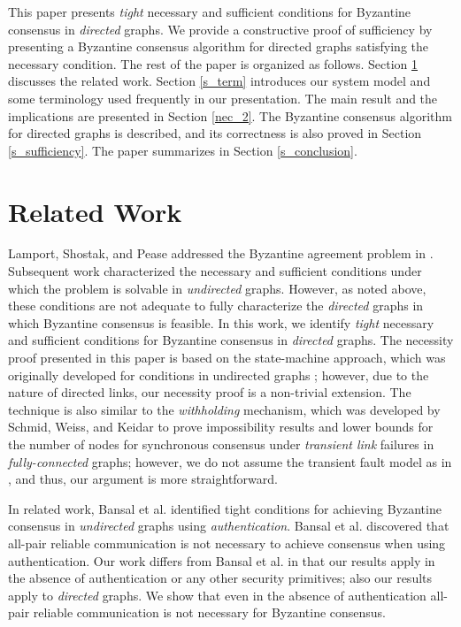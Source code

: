 \documentclass[letterpaper, 11pt]{article}
\begin{document}
This paper presents {\em tight} necessary and sufficient conditions for Byzantine consensus in {\em directed} graphs. We provide a constructive proof of sufficiency by presenting a Byzantine consensus algorithm for directed graphs satisfying the necessary condition. The rest of the paper is organized as follows. Section \ref{s_related} discusses the related work. Section \ref{s_term} introduces our system model and some terminology used frequently in our presentation. The main result and the implications are presented in Section \ref{nec_2}. The Byzantine consensus algorithm for directed graphs is described, and its correctness is also proved in Section \ref{s_sufficiency}. The paper summarizes in Section \ref{s_conclusion}.



\section{Related Work}
\label{s_related}

Lamport, Shostak, and Pease addressed the Byzantine agreement problem in \cite{psl_BG_1982}. Subsequent work \cite{impossible_proof_lynch, dolev_82_BG} characterized the necessary and sufficient conditions under which the problem is solvable in {\em undirected} graphs. However, as noted above, these conditions are not adequate to fully characterize the {\em directed} graphs in which Byzantine consensus is feasible. In this work, we identify {\em tight} necessary and sufficient conditions for Byzantine consensus in {\em directed} graphs. The necessity proof presented in this paper is based on the state-machine approach, which was originally developed for conditions in undirected graphs \cite{impossible_proof_lynch,dolev_82_BG,welch_book}; however, due to the nature of directed links, our necessity proof is a non-trivial extension. The technique is also similar to the {\em withholding} mechanism, which was developed by Schmid, Weiss, and Keidar \cite{impossible_link} to prove impossibility results and lower bounds for the number of nodes for synchronous consensus under {\em transient link} failures in {\em fully-connected} graphs; however, we do not assume the transient fault model as in \cite{impossible_link}, and thus, our argument is more straightforward.

In related work, Bansal et al. \cite{Bansal_disc11} identified tight conditions for achieving Byzantine consensus in {\em undirected} graphs using {\em authentication}. Bansal et al. discovered that all-pair reliable communication is not necessary to achieve consensus when using authentication. Our work differs from Bansal et al. in that our results apply in the absence of authentication or any other security primitives; also our results apply to {\em directed} graphs. We show that even in the absence of authentication all-pair reliable communication is not necessary for Byzantine consensus.
\end{document}
